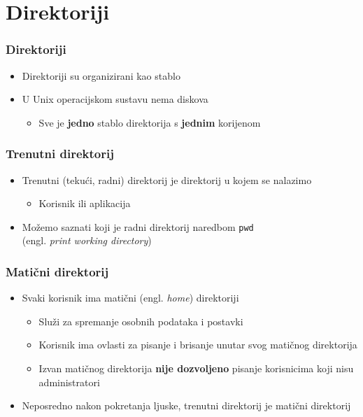 \documentclass{beamer}
\begin{document}
\section{Direktoriji}
\begin{frame}[t]
\frametitle{Direktoriji}
\begin{itemize}
  \item Direktoriji su organizirani kao stablo
  \item U Unix operacijskom sustavu nema diskova
  \begin{itemize}
    \item Sve je \textbf{jedno} stablo direktorija s \textbf{jednim} 
          korijenom
  \end{itemize}
  \centering
\end{itemize}
\end{frame} 


\begin{frame}[t]
\frametitle{Trenutni direktorij}
\begin{itemize}
  \item Trenutni (tekući, radni) direktorij je direktorij u kojem se
        nalazimo
  \begin{itemize}
    \item Korisnik ili aplikacija
  \end{itemize}
  \item Možemo saznati koji je radni direktorij naredbom \texttt{pwd} 
        \\(engl. \emph{print working directory})
\end{itemize}
\end{frame}

\begin{frame}[t]
\frametitle{Matični direktorij}
\begin{itemize}
  \item Svaki korisnik ima matični (engl. \emph{home}) direktoriji
  \begin{itemize}
    \item Služi za spremanje osobnih podataka i postavki
    \item Korisnik ima ovlasti za pisanje i brisanje unutar svog matičnog
          direktorija
    \item Izvan matičnog direktorija \textbf{nije dozvoljeno} pisanje 
          korisnicima koji nisu administratori
  \end{itemize}
  \item Neposredno nakon pokretanja ljuske, trenutni direktorij je matični
        direktorij 
\end{itemize}
\end{frame}
\end{document}
